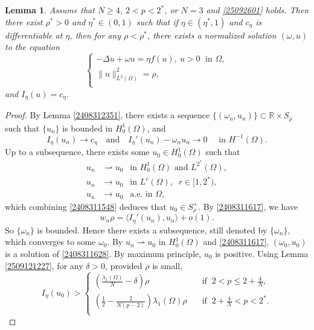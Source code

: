 \documentclass[10pt]{article}
\numberwithin{equation}{section}
\newtheorem{lemma}[theorem]{Lemma}
\numberwithin{equation}{section}
\begin{document}
\begin{lemma}\label{2409010003}
Assume that $N\ge 4$, $2<p<2^*$, or $N=3$ and \eqref{25092601} holds. Then there exist $\rho^*>0$ and $\eta^*\in (0, 1)$ such that  if  $\eta\in (\eta^*, 1)$ and $c_{\eta}$ is differentiable at $\eta$, then for any $\rho<\rho^*$, there exists a  normalized solution $(\omega, u)$ to the equation
\begin{equation}\label{2408311628}
\begin{cases}
-\Delta u+\omega u=\eta f(u),~ u>0 \;\text { in } \Omega, \\
\|u\|^2_{L^2(\Omega)}=\rho,\\
\end{cases}
\end{equation}
and $I_\eta(u)=c_\eta$.
\end{lemma}
\begin{proof}
By Lemma \ref{2408312351}, there exists a sequence $\{(\omega_n, u_n)\}\subset \mathbb{R}\times S_\rho$ such that $\{u_n\}$ is bounded in $H_0^1(\Omega)$, and
\begin{equation}\label{2408311617}
I_\eta(u_n)\to c_\eta\quad\mbox{and}\quad I_{\eta}'(u_n)-\omega_n u_n\to 0\quad \mbox{ in } H^{-1}(\Omega).
\end{equation}
Up to a subsequence, there exists some $u_0\in H_0^1(\Omega)$ such that
\begin{equation*}
\begin{aligned}
{u}_n&\rightharpoonup u_0 ~~\text{ in } H^1_0(\Omega) \text{ and } L^{2^{*}}(\Omega), \\
{u}_n&\rightarrow u_0 ~~\text{ in } L^{r}(\Omega),\;\; r\in [1, 2^*),\\
{u}_n&\rightarrow u_0 ~~{\text{ a.e.}\text{ in }\Omega,}
\end{aligned}
\end{equation*}
which combining \eqref{2408311548} deduces that $u_0\in S_\rho^+$. By \eqref{2408311617}, we have
\[
w_n\rho=\langle I_{\eta}'(u_n), u_n\rangle +o(1).
\]
So $\{\omega_n\}$ is bounded. Hence there exists a subsequence, still denoted by $\{\omega_n\}$, which converges to some $\omega_0$. By ${u}_n\rightharpoonup u_0$ in $H^1_0(\Omega)$ and \eqref{2408311617}, $(\omega_0, u_0)$ is a solution of \eqref{2408311628}.
By maximum principle, $u_0$ is positive. Using Lemma \ref{2509121227}, for any $\delta>0$, provided $\rho$ is small,
\[
I_\eta(u_0)>
\begin{cases}
\left(\frac{\lambda_1(\Omega)}{N}-\delta\right)\rho\quad&\mbox{if}\;\; 2< p\le 2+\frac{4}{N},\\
\left(\frac{1}{2}-\frac{2}{N(p-2)}\right)\lambda_1(\Omega)\rho\quad&\mbox{if}\;\; 2+\frac{4}{N}< p<2^*.\\
\end{cases}
\]


\end{proof}
\end{document}
